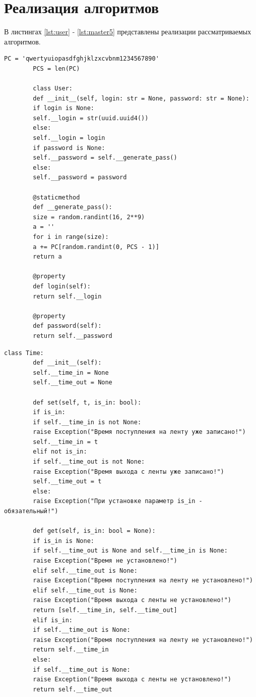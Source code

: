 \documentclass[12pt]{report}
\begin{document}
    \section{Реализация алгоритмов}
    В листингах \ref{lst:user} - \ref{lst:master5} представлены реализации рассматриваемых алгоритмов.
    \newpage
    \captionsetup{singlelinecheck=false, justification=raggedright}
    \begin{lstlisting}[caption=Класс User, label={lst:user}]
    	PC = 'qwertyuiopasdfghjklzxcvbnm1234567890'
    	PCS = len(PC)
    	
    	class User:
    	def __init__(self, login: str = None, password: str = None):
    	if login is None:
    	self.__login = str(uuid.uuid4())
    	else:
    	self.__login = login
    	if password is None:
    	self.__password = self.__generate_pass()
    	else:
    	self.__password = password
    	
    	@staticmethod
    	def __generate_pass():
    	size = random.randint(16, 2**9)
    	a = ''
    	for i in range(size):
    	a += PC[random.randint(0, PCS - 1)]
    	return a
    	
    	@property
    	def login(self):
    	return self.__login
    	
    	@property
    	def password(self):
    	return self.__password
    \end{lstlisting}
    \newpage
    \begin{lstlisting}[caption=Класс Time, label={lst:timeClass}]
    	class Time:
    	def __init__(self):
    	self.__time_in = None
    	self.__time_out = None
    	
    	def set(self, t, is_in: bool):
    	if is_in:
    	if self.__time_in is not None:
    	raise Exception("Время поступления на ленту уже записано!")
    	self.__time_in = t
    	elif not is_in:
    	if self.__time_out is not None:
    	raise Exception("Время выхода с ленты уже записано!")
    	self.__time_out = t
    	else:
    	raise Exception("При установке параметр is_in - обязательный!")
    	
    	def get(self, is_in: bool = None):
    	if is_in is None:
    	if self.__time_out is None and self.__time_in is None:
    	raise Exception("Время не установлено!")
    	elif self.__time_out is None:
    	raise Exception("Время поступления на ленту не установлено!")
    	elif self.__time_out is None:
    	raise Exception("Время выхода с ленты не установлено!")
    	return [self.__time_in, self.__time_out]
    	elif is_in:
    	if self.__time_out is None:
    	raise Exception("Время поступления на ленту не установлено!")
    	return self.__time_in
    	else:
    	if self.__time_out is None:
    	raise Exception("Время выхода с ленты не установлено!")
    	return self.__time_out
    \end{lstlisting}
\end{document}
